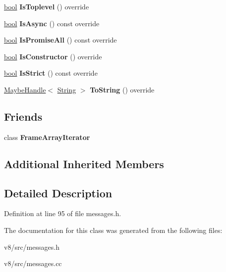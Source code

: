 \begin{DoxyCompactItemize}
\mbox{\label{classv8_1_1internal_1_1JSStackFrame_ab1a268c06be360ad5ab3c170dc60fa3a}} 
\mbox{\hyperlink{classbool}{bool}} {\bfseries Is\+Toplevel} () override
\item 
\mbox{\label{classv8_1_1internal_1_1JSStackFrame_a0a7c46e888f0ed1b31669d9cf0b97e70}} 
\mbox{\hyperlink{classbool}{bool}} {\bfseries Is\+Async} () const override
\item 
\mbox{\label{classv8_1_1internal_1_1JSStackFrame_a92712f4ce3b1967082a63e158299e13f}} 
\mbox{\hyperlink{classbool}{bool}} {\bfseries Is\+Promise\+All} () const override
\item 
\mbox{\label{classv8_1_1internal_1_1JSStackFrame_ace9dde6220cb7be3f00cec8549ca08a1}} 
\mbox{\hyperlink{classbool}{bool}} {\bfseries Is\+Constructor} () override
\item 
\mbox{\label{classv8_1_1internal_1_1JSStackFrame_af789a0aa95f591d974725f215a2b73ec}} 
\mbox{\hyperlink{classbool}{bool}} {\bfseries Is\+Strict} () const override
\item 
\mbox{\label{classv8_1_1internal_1_1JSStackFrame_a73b8c755522a10c75041733316de2a24}} 
\mbox{\hyperlink{classv8_1_1internal_1_1MaybeHandle}{Maybe\+Handle}}$<$ \mbox{\hyperlink{classv8_1_1internal_1_1String}{String}} $>$ {\bfseries To\+String} () override
\end{DoxyCompactItemize}
\subsection*{Friends}
\begin{DoxyCompactItemize}
\item 
\mbox{\label{classv8_1_1internal_1_1JSStackFrame_af3c3172bd938659024c2add527940535}} 
class {\bfseries Frame\+Array\+Iterator}
\end{DoxyCompactItemize}
\subsection*{Additional Inherited Members}


\subsection{Detailed Description}


Definition at line 95 of file messages.\+h.



The documentation for this class was generated from the following files\+:\begin{DoxyCompactItemize}
\item 
v8/src/messages.\+h\item 
v8/src/messages.\+cc\end{DoxyCompactItemize}
